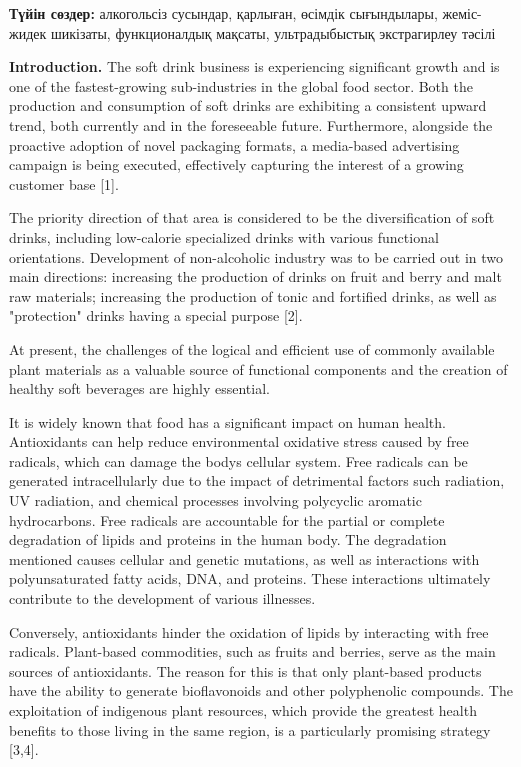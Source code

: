 {\bfseries Түйін сөздер:} алкогольсіз сусындар, қарлыған, өсімдік
сығындылары, жеміс-жидек шикізаты, функционалдық мақсаты, ультрадыбыстық
экстрагирлеу тәсілі

{\bfseries Introduction.} The soft drink business is experiencing
significant growth and is one of the fastest-growing sub-industries in
the global food sector. Both the production and consumption of soft
drinks are exhibiting a consistent upward trend, both currently and in
the foreseeable future. Furthermore, alongside the proactive adoption of
novel packaging formats, a media-based advertising campaign is being
executed, effectively capturing the interest of a growing customer base
{[}1{]}.

The priority direction of that area is considered to be the
diversification of soft drinks, including low-calorie specialized drinks
with various functional orientations. Development of non-alcoholic
industry was to be carried out in two main directions: increasing the
production of drinks on fruit and berry and malt raw materials;
increasing the production of tonic and fortified drinks, as well as
"protection" drinks having a special purpose {[}2{]}.

At present, the challenges of the logical and efficient use of commonly
available plant materials as a valuable source of functional components
and the creation of healthy soft beverages are highly essential.

It is widely known that food has a significant impact on human health.
Antioxidants can help reduce environmental oxidative stress caused by
free radicals, which can damage the body\textquotesingle s cellular
system. Free radicals can be generated intracellularly due to the impact
of detrimental factors such radiation, UV radiation, and chemical
processes involving polycyclic aromatic hydrocarbons. Free radicals are
accountable for the partial or complete degradation of lipids and
proteins in the human body. The degradation mentioned causes cellular
and genetic mutations, as well as interactions with polyunsaturated
fatty acids, DNA, and proteins. These interactions ultimately contribute
to the development of various illnesses.

Conversely, antioxidants hinder the oxidation of lipids by interacting
with free radicals. Plant-based commodities, such as fruits and berries,
serve as the main sources of antioxidants. The reason for this is that
only plant-based products have the ability to generate bioflavonoids and
other polyphenolic compounds. The exploitation of indigenous plant
resources, which provide the greatest health benefits to those living in
the same region, is a particularly promising strategy {[}3,4{]}.


